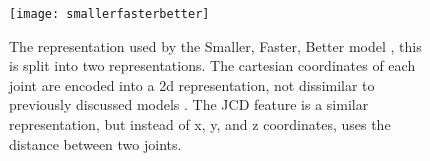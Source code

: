 \begin{figure}[ht]
	\texttt{[image: smallerfasterbetter]}
	\centering
	\caption{The representation used by the Smaller, Faster, Better model \cite{smaller_faster_better}, this is split into two representations. The cartesian coordinates of each joint are encoded into a 2d representation, not dissimilar to previously discussed models \cite{simple_yet_efficient}. The JCD feature is a similar representation, but instead of x, y, and z coordinates, uses the distance between two joints.}
	\label{fig:smallerfasterbetter}
\end{figure}